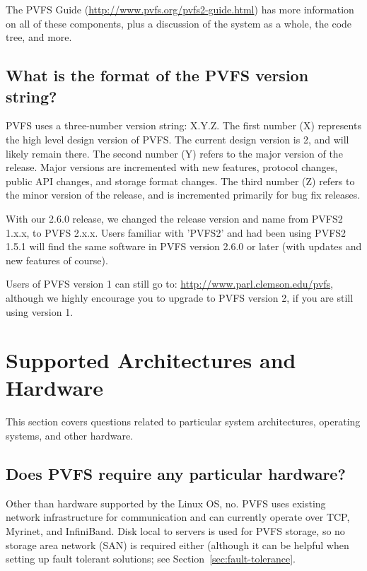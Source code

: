 \documentclass[11pt,letterpaper]{article}
\begin{document}
The PVFS Guide (\url{http://www.pvfs.org/pvfs2-guide.html}) has more
information on all of these components, plus a discussion of the system as a
whole, the code tree, and more.

\subsection{What is the format of the PVFS version string?}
\label{sec:version-string}
PVFS uses a three-number version string: X.Y.Z.  The first number (X)
represents the high level design version of PVFS.  The current design
version is 2, and will likely remain there.  The second number (Y) refers
to the major version of the release.  Major versions are incremented with
new features, protocol changes, public API changes, and storage format
changes.  The third number (Z) refers to the minor version of the release,
and is incremented primarily for bug fix releases.

With our 2.6.0 release,
we changed the release version and name from PVFS2 1.x.x, to PVFS 2.x.x.
Users familiar with 'PVFS2' and had been using PVFS2 1.5.1 
will find the same software in PVFS version 2.6.0 or
later (with updates and new features of course).

Users of PVFS version 1 can still go to:
\url{http://www.parl.clemson.edu/pvfs}, although we highly
encourage you to upgrade to PVFS version 2, if you are still using
version 1.

%
%
\section{Supported Architectures and Hardware}

This section covers questions related to particular system architectures,
operating systems, and other hardware.

\subsection{Does PVFS require any particular hardware?}

Other than hardware supported by the Linux OS, no.  PVFS uses
existing network infrastructure for communication and can currently
operate over TCP, Myrinet, and InfiniBand.  Disk local to servers is
used for PVFS storage, so no storage area network (SAN) is required
either (although it can be helpful when setting up fault tolerant solutions;
see Section~\ref{sec:fault-tolerance}.
\end{document}
